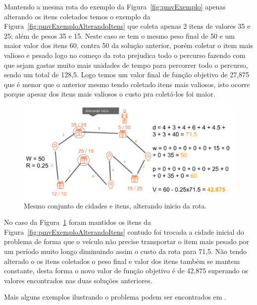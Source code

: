 Mantendo a mesma rota do exemplo da Figura~\ref{fig:pmvExemplo} apenas alterando os itens coletados temos o exemplo da Figura~\ref{fig:pmvExemploAlterandoItens} que coleta apenas 2 itens de valores 35 e 25; além de pesos 35 e 15.
Neste caso se tem o mesmo peso final de 50 e um maior valor dos itens 60, contra 50 da solução anterior, porém coletar o item mais valioso e pesado logo no começo da rota prejudica todo o percurso fazendo com que sejam gastas muito mais unidades de tempo para percorrer todo o percurso, sendo um total de 128,5.
Logo temos um valor final de função objetivo de 27,875 que é menor que o anterior mesmo tendo coletado itens mais valiosos, isto ocorre porque apesar dos itens mais valiosos o custo pra coletá-los foi maior.

\begin{figure}[htpb]
    \centering
    \includegraphics[width=0.8\linewidth]{figuras/pmv/example03.png}
    \caption{Mesmo conjunto de cidades e itens, alterando inicio da rota.}
    \label{fig:pmvExemploAlterandoInicio}
\end{figure}

No caso da Figura~\ref{fig:pmvExemploAlterandoInicio} foram mantidos os itens da Figura~\ref{fig:pmvExemploAlterandoItens} contudo foi trocada a cidade inicial do problema de forma que o veículo não precise transportar o item mais pesado por um período muito longo diminuindo assim o custo da rota para 71,5.
Não tendo alterado o os itens coletados o peso final e valor dos itens também se mantem constante, desta forma o novo valor de função objetivo é de 42,875 superando os valores encontrados nas duas soluções anteriores.

Mais alguns exemplos ilustrando o problema podem ser encontrados em \cite{Bonyadi:2013, Oliveira:2015}.
